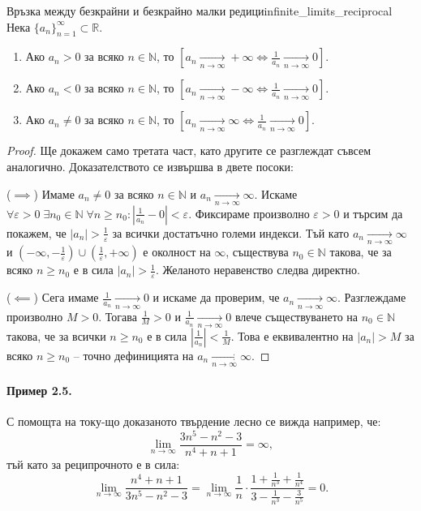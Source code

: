 \begin{theorem}{Връзка между безкрайни и безкрайно малки редици}{infinite_limits_reciprocal}
Нека $\{a_n\}_{n=1}^{\infty} \subset \mathbb{R}$.
\begin{enumerate}
    \item Ако $a_n > 0$ за всяко $n \in \mathbb{N}$, то $\left[ a_n \xrightarrow[n\to\infty]{} +\infty \iff \frac{1}{a_n} \xrightarrow[n\to\infty]{} 0 \right]$.
    \item Ако $a_n < 0$ за всяко $n \in \mathbb{N}$, то $\left[ a_n \xrightarrow[n\to\infty]{} -\infty \iff \frac{1}{a_n} \xrightarrow[n\to\infty]{} 0 \right]$.
    \item Ако $a_n \ne 0$ за всяко $n \in \mathbb{N}$, то $\left[ a_n \xrightarrow[n\to\infty]{} \infty \iff \frac{1}{a_n} \xrightarrow[n\to\infty]{} 0 \right]$.
\end{enumerate}
\end{theorem}

\begin{proof}
Ще докажем само третата част, като другите се разглеждат съвсем аналогично. Доказателството се извършва в двете посоки:

($\implies$) Имаме $a_n \ne 0$ за всяко $n \in \mathbb{N}$ и $a_n \xrightarrow[n\to\infty]{} \infty$. Искаме $\forall \varepsilon > 0 \; \exists n_0 \in \mathbb{N} \; \forall n \ge n_0 : \left|\frac{1}{a_n} - 0\right| < \varepsilon$. Фиксираме произволно $\varepsilon > 0$ и търсим да покажем, че $|a_n| > \frac{1}{\varepsilon}$ за всички достатъчно големи индекси. Тъй като $a_n \xrightarrow[n\to\infty]{} \infty$ и $\left(-\infty, -\frac{1}{\varepsilon}\right) \cup \left(\frac{1}{\varepsilon}, +\infty\right)$ е околност на $\infty$, съществува $n_0 \in \mathbb{N}$ такова, че за всяко $n \ge n_0$ е в сила $|a_n| > \frac{1}{\varepsilon}$. Желаното неравенство следва директно.

($\impliedby$) Сега имаме $\frac{1}{a_n} \xrightarrow[n\to\infty]{} 0$ и искаме да проверим, че $a_n \xrightarrow[n\to\infty]{} \infty$. Разглеждаме произволно $M > 0$. Тогава $\frac{1}{M} > 0$ и $\frac{1}{a_n} \xrightarrow[n\to\infty]{} 0$ влече съществуването на $n_0 \in \mathbb{N}$ такова, че за всички $n \ge n_0$ е в сила $\left|\frac{1}{a_n}\right| < \frac{1}{M}$. Това е еквивалентно на $|a_n| > M$ за всяко $n \ge n_0$ -- точно дефиницията на $a_n \xrightarrow[n\to\infty]{} \infty$.
\end{proof}

\paragraph{Пример 2.5.}
С помощта на току-що доказаното твърдение лесно се вижда например, че:
\[
\lim_{n\to\infty} \frac{3n^5 - n^2 - 3}{n^4 + n + 1} = \infty,
\]
тъй като за реципрочното е в сила:
\[
\lim_{n\to\infty} \frac{n^4 + n + 1}{3n^5 - n^2 - 3} = \lim_{n\to\infty} \frac{1}{n} \cdot \frac{1 + \frac{1}{n^3} + \frac{1}{n^4}}{3 - \frac{1}{n^3} - \frac{3}{n^5}} = 0.
\]

